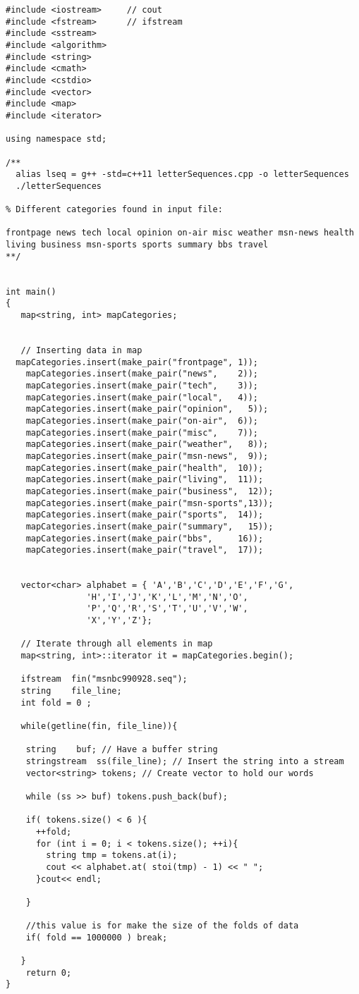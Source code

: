 \begin{lstlisting}[frame=single,basicstyle=\ttfamily\tiny,]
#include <iostream>     // cout
#include <fstream>      // ifstream
#include <sstream>
#include <algorithm>
#include <string>
#include <cmath>
#include <cstdio>
#include <vector>
#include <map>
#include <iterator>

using namespace std;

/** 
  alias lseq = g++ -std=c++11 letterSequences.cpp -o letterSequences 
  ./letterSequences

% Different categories found in input file:

frontpage news tech local opinion on-air misc weather msn-news health living business msn-sports sports summary bbs travel
**/

 
int main()
{
   map<string, int> mapCategories;

  
   // Inserting data in map
  mapCategories.insert(make_pair("frontpage", 1));
    mapCategories.insert(make_pair("news",    2));
    mapCategories.insert(make_pair("tech",    3));
    mapCategories.insert(make_pair("local",   4));
    mapCategories.insert(make_pair("opinion",   5));
    mapCategories.insert(make_pair("on-air",  6));
    mapCategories.insert(make_pair("misc",    7));
    mapCategories.insert(make_pair("weather",   8));
    mapCategories.insert(make_pair("msn-news",  9));
    mapCategories.insert(make_pair("health",  10));
    mapCategories.insert(make_pair("living",  11));
    mapCategories.insert(make_pair("business",  12));
    mapCategories.insert(make_pair("msn-sports",13));
    mapCategories.insert(make_pair("sports",  14));
    mapCategories.insert(make_pair("summary",   15));
    mapCategories.insert(make_pair("bbs",     16));
    mapCategories.insert(make_pair("travel",  17));
    

   vector<char> alphabet = { 'A','B','C','D','E','F','G',
                'H','I','J','K','L','M','N','O',
                'P','Q','R','S','T','U','V','W',
                'X','Y','Z'};

   // Iterate through all elements in map
   map<string, int>::iterator it = mapCategories.begin();

   ifstream  fin("msnbc990928.seq");
   string    file_line;
   int fold = 0 ;

   while(getline(fin, file_line)){

    string    buf; // Have a buffer string
    stringstream  ss(file_line); // Insert the string into a stream
    vector<string> tokens; // Create vector to hold our words
    
    while (ss >> buf) tokens.push_back(buf);

    if( tokens.size() < 6 ){
      ++fold;
      for (int i = 0; i < tokens.size(); ++i){
        string tmp = tokens.at(i); 
        cout << alphabet.at( stoi(tmp) - 1) << " ";
      }cout<< endl;

    }

    //this value is for make the size of the folds of data
    if( fold == 1000000 ) break;

   }
    return 0;
}
\end{lstlisting}











